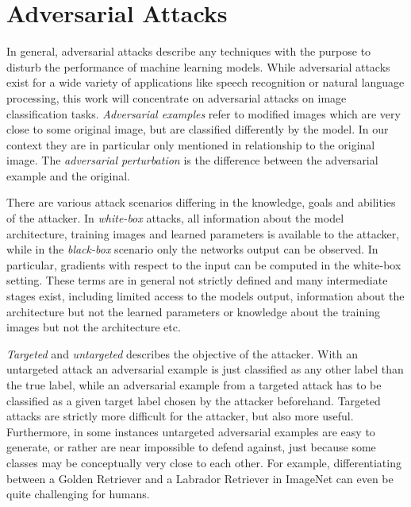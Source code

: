 
\section{Adversarial Attacks}
\label{sec:attacks}

In general, adversarial attacks describe any techniques with the purpose to disturb the performance of machine learning models.
While adversarial attacks exist for a wide variety of applications like speech recognition or natural language processing, this work will concentrate on adversarial attacks on image classification tasks.
\emph{Adversarial examples} refer to modified images which are very close to some original image, but are classified differently by the model.
In our context they are in particular only mentioned in relationship to the original image.
The \emph{adversarial perturbation} is the difference between the adversarial example and the original.

There are various attack scenarios differing in the knowledge, goals and abilities of the attacker.
In \emph{white-box} attacks, all information about the model architecture, training images and learned parameters is available to the attacker, while in the \emph{black-box} scenario only the networks output can be observed.
In particular, gradients with respect to the input can be computed in the white-box setting.
These terms are in general not strictly defined and many intermediate stages exist, including limited access to the models output, information about the architecture but not the learned parameters or knowledge about the training images but not the architecture etc.

\emph{Targeted} and \emph{untargeted} describes the objective of the attacker.
With an untargeted attack an adversarial example is just classified as any other label than the true label, while an adversarial example from a targeted attack has to be classified as a given target label chosen by the attacker beforehand.
Targeted attacks are strictly more difficult for the attacker, but also more useful.
Furthermore, in some instances untargeted adversarial examples are easy to generate, or rather are near impossible to defend against, just because some classes may be conceptually very close to each other.
For example, differentiating between a Golden Retriever and a Labrador Retriever in ImageNet \citep{imagenet} can even be quite challenging for humans.

